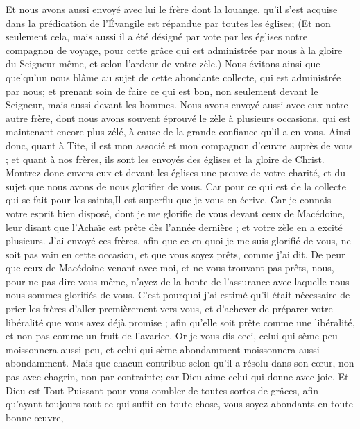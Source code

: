 \begin{multicols}{2}
Et nous avons aussi envoyé avec lui le frère dont la louange, qu'il s'est acquise dans la prédication de l'Évangile est répandue par toutes les églises;
 (Et non seulement cela, mais aussi il a été désigné par vote par les églises notre compagnon de voyage, pour cette grâce qui est administrée par nous à la gloire du Seigneur même, et selon l'ardeur de votre zèle.)
Nous évitons ainsi que quelqu'un nous blâme au sujet de cette abondante collecte, qui est administrée par nous;
et prenant soin de faire ce qui est bon, non seulement devant le Seigneur, mais aussi devant les hommes.
Nous avons envoyé aussi avec eux notre autre frère, dont nous avons souvent éprouvé le zèle à plusieurs occasions, qui est maintenant encore plus zélé, à cause de la grande confiance qu'il a en vous.
Ainsi donc, quant à Tite, il est mon associé et mon compagnon d’œuvre auprès de vous ; et quant à nos frères, ils sont les envoyés des églises et la gloire de Christ.
Montrez donc envers eux et devant les églises une preuve de votre charité, et du sujet que nous avons de nous glorifier de vous.
\VerseOne{}Car pour ce qui est de la collecte qui se fait pour les saints,Il est superflu que je vous en écrive.
Car je connais votre esprit bien disposé, dont je me glorifie de vous devant ceux de Macédoine, leur disant que l’Achaïe est prête dès l'année dernière ; et votre zèle en a excité plusieurs.
J’ai envoyé ces frères, afin que ce en quoi je me suis glorifié de vous, ne soit pas vain en cette occasion, et que vous soyez prêts, comme j'ai dit.
De peur que ceux de Macédoine venant avec moi, et ne vous trouvant pas prêts, nous, pour ne pas dire vous même, n'ayez de la honte de l'assurance avec laquelle nous nous sommes glorifiés de vous.
C'est pourquoi j'ai estimé qu'il était nécessaire de prier les frères d'aller premièrement vers vous, et d'achever de préparer votre libéralité que vous avez déjà promise ; afin qu'elle soit prête comme une libéralité, et non pas comme un fruit de l'avarice.
Or je vous dis ceci, celui qui sème peu moissonnera aussi peu, et celui qui sème abondamment moissonnera aussi abondamment.
Mais que chacun contribue selon qu'il a résolu dans son cœur, non pas avec chagrin, non par contrainte; car Dieu aime celui qui donne avec joie.
Et Dieu est Tout-Puissant pour vous combler de toutes sortes de grâces, afin qu'ayant toujours tout ce qui suffit en toute chose, vous soyez abondants en toute bonne œuvre,

\end{multicols}
